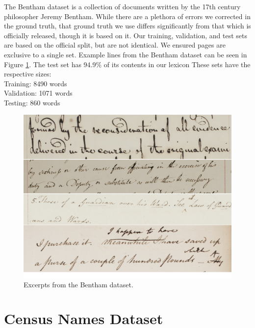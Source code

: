 \documentclass[ms,electronic,twosidetoc,letterpaper,chaptercenter,parttop,lof,lot]{byumsphd}
\begin{document}
The Bentham dataset \cite{bentham} is a collection of documents written by the 17th century philosopher Jeremy Bentham. While there are a plethora of errors we corrected in the ground truth, that ground truth we use differs significantly from that which is officially released, though it is based on it. 
Our training, validation, and test sets are based on the official split, but are not identical.
We ensured pages are exclusive to a single set.
Example lines from the Bentham dataset can be seen in Figure \ref{fig:BenthamExamples}.
The test set has 94.9\% of its contents in our lexicon
These sets have the respective sizes:\\
\indent \indent Training: 8490 words\\
\indent \indent Validation: 1071 words\\
\indent \indent Testing: 860 words

\begin{figure}
    \centering
    \includegraphics[width=.9\textwidth]{bentham_examples}
    \caption{Excerpts from the Bentham dataset.}
    \label{fig:BenthamExamples}
\end{figure}

\section{Census Names Dataset}
\end{document}
